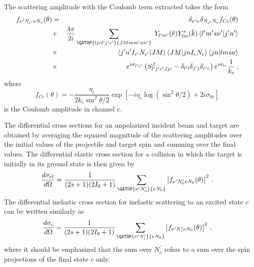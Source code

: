 The scattering amplitude with the Coulomb term extracted takes the form
\begin{eqnarray}
f_{\nu^{\prime}N_{c^{\prime}}\nu N_{c}}(\theta) & = &
\delta_{\nu^{\prime}\nu}\delta_{N_{c^{\prime}}N_{c}}f_{Cc}(\theta) \\
& + & \frac{4\pi}{2i}\sum_{{{\QATOP{ljcl^{\prime}j^{\prime}c^{\prime}}{%
JMmm^{\prime}nn^{\prime}}}}}\; Y_{l^{\prime}m^{\prime}}(\hat{r})Y_{lm}^{*}(%
\hat{k})\left\langle
l^{\prime}m^{\prime}s\nu^{\prime}|j^{\prime}n^{\prime}\right\rangle
\nonumber \\
& \times &\left\langle
j^{\prime}n^{\prime}I_{c^{\prime}}N_{c^{\prime}}|JM\right\rangle
\left\langle JM|jnI_{c}N_{c}\right\rangle \left\langle jn|lms\nu\right\rangle
\nonumber \\
&\times &
e^{i\sigma_{l^{\prime}c^{\prime}}}\left(S_{l^{\prime}j^{\prime}c^{%
\prime},ljc}^{J}-\delta_{l^{\prime}l}\delta_{j^{\prime}j}\delta_{c^{%
\prime}c}\right)e^{i\sigma_{lc}}\frac{1}{k_{c}}\,,  \nonumber
\end{eqnarray}
where
\begin{equation}
f_{Cc}(\theta)=-\frac{\eta_{c}}{2k_{c}\sin^{2}\theta/2}\exp\left[%
-i\eta_{c}\log\left(\sin^{2}\theta/2\right)+2i\sigma_{0c}\right]
\end{equation}
is the Coulomb amplitude in channel $c$.

The differential cross sections for an unpolarized incident beam and target
are obtained by averaging the squared magnitude of the scattering amplitudes
over the initial values of the projectile and target spin and summing over
the final values. The differential elastic cross section for a collision in
which the target is initially in its ground state is then given by
\begin{equation}
\frac{d\sigma_{el}}{d\Omega}=\frac{1}{(2s+1)(2I_{0}+1)}\sum_{{{\QATOP{%
\nu^{\prime}N_{0}^{\prime}}{\nu N_{0}}}}}\left|f_{\nu^{\prime}N_{0}^{\prime}%
\nu N_{0}}(\theta)\right|^{2}\,.  \label{celf}
\end{equation}
The differential inelastic cross section for inelastic scattering to an
excited state $c$ can be written similarly as
\begin{equation}
\frac{d\sigma_{c}}{d\Omega}=\frac{1}{(2s+1)(2I_{0}+1)}\sum_{{{\QATOP{%
\nu^{\prime}N_{c}^{\prime}}{\nu N_{0}}}}}\left|f_{\nu^{\prime}N_{c}^{\prime}%
\nu N_{0}}(\theta)\right|^{2}\,,
\end{equation}
where it should be emphasized that the sum over $N_{c}^{\prime}$ refers to a
sum over the spin projections of the final state $c$ only.

